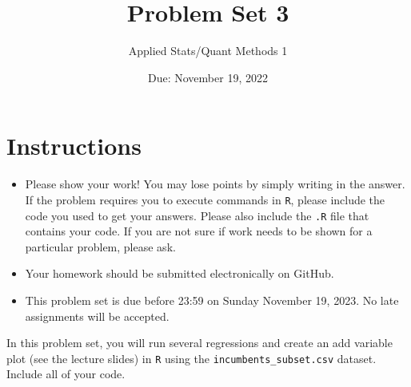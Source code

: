 \documentclass[12pt,letterpaper]{article}
\title{Problem Set 3}
\date{Due: November 19, 2022}
\author{Applied Stats/Quant Methods 1}
\begin{document}
	\maketitle
	\section*{Instructions}
	\begin{itemize}
		\item Please show your work! You may lose points by simply writing in the answer. If the problem requires you to execute commands in \texttt{R}, please include the code you used to get your answers. Please also include the \texttt{.R} file that contains your code. If you are not sure if work needs to be shown for a particular problem, please ask.
	\item Your homework should be submitted electronically on GitHub.
	\item This problem set is due before 23:59 on Sunday November 19, 2023. No late assignments will be accepted.

	\end{itemize}

		\vspace{.25cm}
	
\noindent In this problem set, you will run several regressions and create an add variable plot (see the lecture slides) in \texttt{R} using the \texttt{incumbents\_subset.csv} dataset. Include all of your code.

	\vspace{.5cm}
\end{document}
